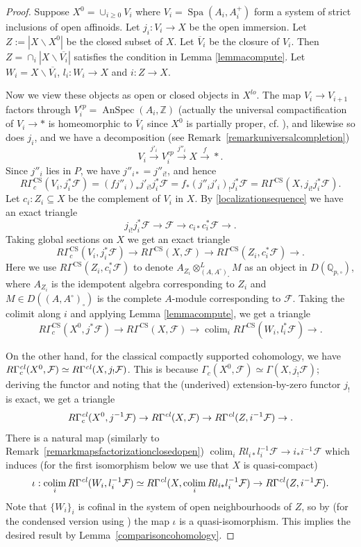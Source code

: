 \documentclass[a4paper,10pt]{amsart}
\theoremstyle{remark}
\theoremstyle{definition}
\theoremstyle{plain}
\numberwithin{equation}{section}
\newcommand{\bbQ}{{\mathbb Q}}
\newcommand{\bbZ}{{\mathbb Z}}
\newcommand{\calF}{{\mathcal F}}
\newcommand{\ovV}{{\overline V}}
\newcommand{\CS}{\ensuremath{\mathrm{CS}}}
\DeclareMathOperator{\Spa}{Spa}
\DeclareMathOperator{\colim}{colim}
\DeclareMathOperator{\AnSpec}{AnSpec}
\begin{document}
\begin{proof}
	Suppose $X^0=\cup_{i\geq 0} V_i$ where $V_i=\Spa(A_i,A^+_i)$ form a system of strict inclusions of open affinoids. Let $j_i:V_i\to X$ be the open immersion. Let $Z:=|X\backslash X^0|$ be the closed subset of $X$. Let $\ovV_i$ be the closure of $V_i$. Then $Z=\cap_i |X\backslash \overline{V_i}|$ satisfies the condition in Lemma \ref{lemmacompute}. Let $W_i=X\backslash \overline{V_i}$, $l_i: W_i\to X$ and $i:Z\to X$. 

	Now we view these objects as open or closed objects in $X^{lo}$. The map $V_i\to V_{i+1}$ factors through $V_i^{cp}=\AnSpec(A_i,\bbZ)$ (actually the universal compactification of $V_i\rightarrow *$ is homeomorphic to $\ovV_i$ since $X^0$ is partially proper, cf. \cite[Prop.~3.4.5(1)]{achingerLaraYoucis2023geometric}), and likewise so does $j_i$, and we have a decomposition (see Remark~\ref{remarkuniversalcompletion})
	$$V_i\stackrel{j'_i} \longrightarrow V_i^{cp}\stackrel{j''_i}\longrightarrow X\stackrel{f}\longrightarrow *.$$
	Since $j''_i$ lies in $P$, we have $j''_{i*}=j''_{i!}$, and hence 
	$$R\Gamma^{\CS}_c(V_i,j_i^*\calF)=(fj''_i)_*j'_{i!}j_i^*\calF=f_*(j''_ij'_i)_!j_i^*\calF=R\Gamma^{\CS}(X,j_{i!}j^*_i\calF).$$ 
	Let $c_i:Z_i\subseteq X$ be the complement of $V_i$ in $X$. By \eqref{localizationsequence} we have an exact triangle
	$$j_{i!}j^*_i\calF\to \calF\to c_{i*}c^*_i\calF\to .$$
	Taking global sections on $X$ we get an exact triangle
	$$R\Gamma^{\CS}_c(V_i,j^*_i\calF)\to R\Gamma^{\CS}(X,\calF)\to R\Gamma^{\CS}(Z_i,c^*_i\calF)\to .$$
	Here we use $R\Gamma^{\CS}(Z_i,c^*_i\calF)$ to denote $A_{Z_i}\otimes_{(A,A^{\circ})_\square}^L M$ as an object in $D(\bbQ_{p,\square})$, where $A_{Z_i}$ is the idempotent algebra corresponding to $Z_i$ and $M\in D((A,A^{\circ})_\square)$ is the complete $A$-module corresponding to $\calF$. Taking the colimit along $i$ and applying Lemma \ref{lemmacompute}, we get a triangle
	$$R\Gamma^{\CS}_c(X^0,j^*\calF)\to R\Gamma^{\CS}(X,\calF)\to \colim_i R\Gamma^{\CS}(W_i,l_i^*\calF)\to .$$
	
	On the other hand, for the classical compactly supported cohomology, we have $R\Gamma^{\it cl}_c(X^0,\calF)\simeq R\Gamma^{\it cl}(X,j_!\calF)$. This is because $\Gamma_c(X^0,\calF)\simeq \Gamma(X,j_!\calF)$; deriving the functor and noting that the (underived) extension-by-zero functor $j_!$ is exact, we get a triangle
	$$R\Gamma^{\it cl}_c(X^0,j^{-1}\calF)\to R\Gamma^{\it cl}(X,\calF)\to  R\Gamma^{\it cl}(Z,i^{-1}\calF)\to .$$
	There is a natural map (similarly to Remark~\ref{remarkmapsfactorizationclosedopen}) $\colim_i Rl_{i*}l^{-1}_i\calF\to i_*i^{-1}\calF$ which induces (for the first isomorphism below we use that $X$ is quasi-compact)
	$$\iota: \colim_i R\Gamma^{\it cl}(W_i,l_i^{-1}\calF)\simeq R\Gamma^{\it cl}(X,\colim_i Rl_{i*}l^{-1}_i\calF)\to R\Gamma^{\it cl}(Z,i^{-1}\calF).$$
	Note that $\{W_i\}_i$ is cofinal in the system of open neighbourhoods of $Z$, so by \cite[Lem.~2.12]{abeLazda2025proper} (for the condensed version using \cite[Prop.~A.13]{li2026locallyanalyticvectorscompleted}) the map $\iota$ is a quasi-isomorphism. This implies the desired result by Lemma~\ref{comparisoncohomology}.
\end{proof}
\end{document}
